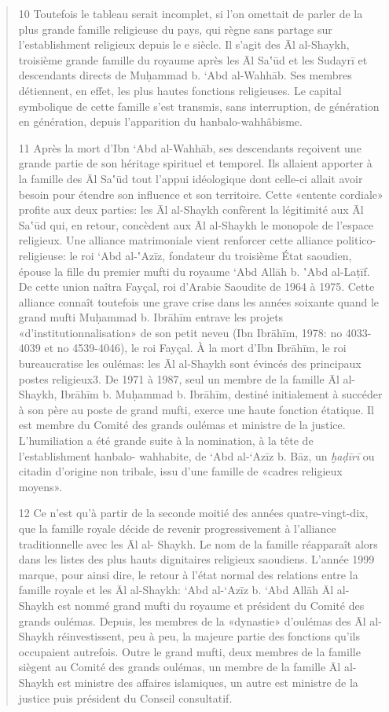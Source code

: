 \begin{quote}
10 Toutefois le tableau serait incomplet, si l'on omettait de parler de
la plus grande famille religieuse du pays, qui règne sans partage sur
l'establishment religieux depuis le
e siècle. Il s'agit des Āl al-Shaykh, troisième grande famille du
royaume après les Āl
Sa‛ūd et les Sudayrī et descendants directs de Muḥammad b. `Abd
al-Wahhāb. Ses membres détiennent, en effet, les plus hautes fonctions
religieuses. Le capital symbolique de cette famille s'est transmis, sans
interruption, de génération en génération, depuis l'apparition du
hanbalo-wahhâbisme.

11 Après la mort d'Ibn `Abd al-Wahhāb, ses descendants reçoivent une
grande partie de son héritage spirituel et temporel. Ils allaient
apporter à la famille des Āl Sa‛ūd tout l'appui idéologique dont
celle-ci allait avoir besoin pour étendre son influence et son
territoire. Cette «entente cordiale» profite aux deux parties: les Āl
al-Shaykh confèrent la légitimité aux Āl Sa‛ūd qui, en retour, concèdent
aux Āl al-Shaykh le monopole de l'espace religieux. Une alliance
matrimoniale vient renforcer cette alliance politico- religieuse: le roi
`Abd al-‛Azīz, fondateur du troisième État saoudien, épouse la fille du
premier mufti du royaume `Abd Allāh b. ‛Abd al-Laṭīf. De cette union
naîtra Fayçal, roi d'Arabie Saoudite de 1964 à 1975. Cette alliance
connaît toutefois une grave crise dans les années soixante quand le
grand mufti Muḥammad b. Ibrāhīm entrave les projets
«d'institutionnalisation» de son petit neveu (Ibn Ibrāhīm, 1978: no
4033-4039 et no
4539-4046), le roi Fayçal. À la mort d'Ibn Ibrāhīm, le roi bureaucratise
les oulémas: les Āl al-Shaykh sont évincés des principaux postes
religieux3. De 1971 à 1987, seul un membre de la famille Āl al-Shaykh,
Ibrāhīm b. Muḥammad b. Ibrāhīm, destiné initialement à succéder à son
père au poste de grand mufti, exerce une haute fonction étatique. Il est
membre du Comité des grands oulémas et ministre de la justice.
L'humiliation a été grande suite à la nomination, à la tête de
l'establishment hanbalo- wahhabite, de `Abd al-`Azīz b. Bāz, un
\emph{ḫaḍīrī} ou citadin d'origine non tribale, issu d'une famille de
«cadres religieux moyens».

12 Ce n'est qu'à partir de la seconde moitié des années
quatre-vingt-dix, que la famille royale décide de revenir
progressivement à l'alliance traditionnelle avec les Āl al- Shaykh. Le
nom de la famille réapparaît alors dans les listes des plus hauts
dignitaires religieux saoudiens. L'année 1999 marque, pour ainsi dire,
le retour à l'état normal des relations entre la famille royale et les
Āl al-Shaykh: `Abd al-`Azīz b. `Abd Allāh Āl al- Shaykh est nommé grand
mufti du royaume et président du Comité des grands oulémas. Depuis, les
membres de la «dynastie» d'oulémas des Āl al-Shaykh réinvestissent, peu
à peu, la majeure partie des fonctions qu'ils occupaient autrefois.
Outre le grand mufti, deux membres de la famille siègent au Comité des
grands oulémas, un membre de la famille Āl al-Shaykh est ministre des
affaires islamiques, un autre est ministre de la justice puis président
du Conseil consultatif.


\end{quote}

